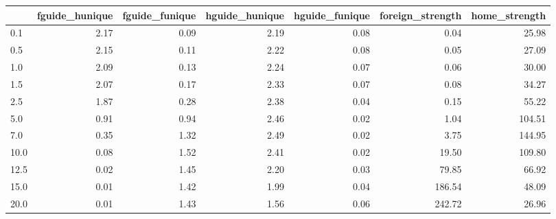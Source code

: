 \begin{tabular}{lrrrrrr}
\toprule
 & fguide_hunique & fguide_funique & hguide_hunique & hguide_funique & foreign_strength & home_strength \\
\midrule
0.1 & 2.17 & 0.09 & 2.19 & 0.08 & 0.04 & 25.98 \\
0.5 & 2.15 & 0.11 & 2.22 & 0.08 & 0.05 & 27.09 \\
1.0 & 2.09 & 0.13 & 2.24 & 0.07 & 0.06 & 30.00 \\
1.5 & 2.07 & 0.17 & 2.33 & 0.07 & 0.08 & 34.27 \\
2.5 & 1.87 & 0.28 & 2.38 & 0.04 & 0.15 & 55.22 \\
5.0 & 0.91 & 0.94 & 2.46 & 0.02 & 1.04 & 104.51 \\
7.0 & 0.35 & 1.32 & 2.49 & 0.02 & 3.75 & 144.95 \\
10.0 & 0.08 & 1.52 & 2.41 & 0.02 & 19.50 & 109.80 \\
12.5 & 0.02 & 1.45 & 2.20 & 0.03 & 79.85 & 66.92 \\
15.0 & 0.01 & 1.42 & 1.99 & 0.04 & 186.54 & 48.09 \\
20.0 & 0.01 & 1.43 & 1.56 & 0.06 & 242.72 & 26.96 \\
\bottomrule
\end{tabular}

